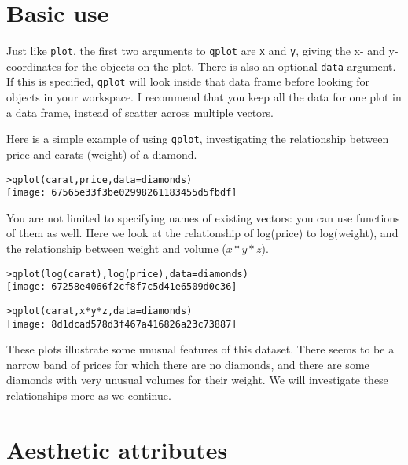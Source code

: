 \section{Basic use}\label{sec:basic_use}

Just like {\tt plot}, the first two arguments to {\tt qplot} are {\tt x} and {\tt y}, giving the x- and y-coordinates for the objects on the plot. There is also an optional {\tt data} argument.  If this is specified, {\tt qplot} will look inside that data frame before looking for objects in your workspace.  I recommend that you keep all the data for one plot in a data frame, instead of scatter across multiple vectors.

Here is a simple example of using {\tt qplot}, investigating the relationship between price and carats (weight) of a diamond.  

\begin{alltt}
> qplot(carat, price, data = diamonds)
\texttt{[image: 67565e33f3be02998261183455d5fbdf]}

\end{alltt}

You are not limited to specifying names of existing vectors: you can use functions of them as well.  Here we look at the relationship of log(price) to log(weight), and the relationship between weight and volume ($x * y * z$).

\begin{alltt}
> qplot(log(carat), log(price), data = diamonds)
\texttt{[image: 67258e4066f2cf8f7c5d41e6509d0c36]}

> qplot(carat, x * y * z, data = diamonds)
\texttt{[image: 8d1dcad578d3f467a416826a23c73887]}

\end{alltt}

These plots illustrate some unusual features of this dataset.  There seems to be a narrow band of prices for which there are no diamonds, and there are some diamonds with very unusual volumes for their weight.  We will investigate these relationships more as we continue.

\section{Aesthetic attributes}\label{sec:aesthetic_attributes}

